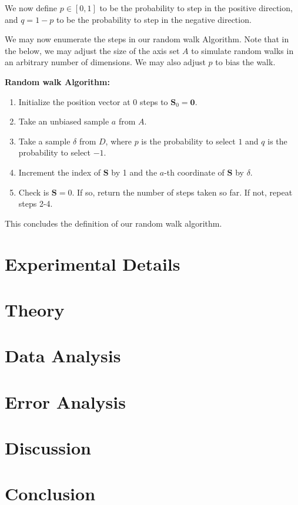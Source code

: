 \documentclass{article}
\begin{document}
We now define $p \in [0,1]$ to be the probability to step in the positive direction, and $q = 1-p$ to be the probability to step in the negative direction.

We may now enumerate the steps in our random walk Algorithm. Note that in the below, we may adjust the size of the axis set $A$ to simulate random walks in an arbitrary number of dimensions. We may also adjust $p$ to bias the walk.

\textbf{Random walk Algorithm:}
\begin{enumerate}
    \item Initialize the position vector at $0$ steps to  $\mathbf{S}_0 = \mathbf{0}$.
    \item Take an unbiased sample $a$ from $A$.
    \item Take a sample $\delta$ from $D$, where $p$ is the probability to select $1$ and $q$ is the probability to select $-1$.
    \item Increment the index of $\mathbf{S}$ by 1 and the  $a$-th coordinate of $\mathbf{S}$ by $\delta$.
    \item Check is $\mathbf{S} = 0$. If so, return the number of steps taken so far. If not, repeat steps 2-4.
\end{enumerate}

This concludes the definition of our random walk algorithm.

\section{Experimental Details}

\section{Theory}

\section{Data Analysis}

\section{Error Analysis}

\section{Discussion}

\section{Conclusion}
\end{document}

